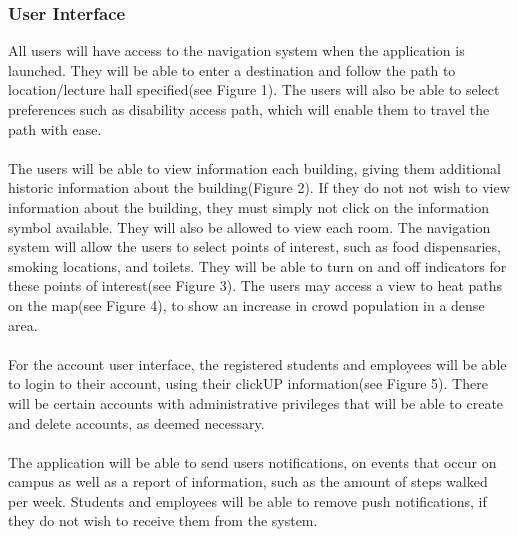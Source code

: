 \documentclass{article}
\begin{document}
            \subsubsection{User Interface}
	    {All users will have access to the navigation system when the application is launched.
They will be able to enter a destination and follow the path to location/lecture hall specified(see Figure 1).
The users will also be able to select preferences such as disability access path, which will enable them to travel the path with ease.\\\\
The users will be able to view information each building, giving them additional historic information about the building(Figure 2). If they do not not wish to 
view information about the building, they must simply not click on the information symbol available.
They will also be allowed to view each room. The navigation system will allow the users to select points of interest, such as food dispensaries, 
smoking locations, and toilets. They will be able to turn on and off indicators for these points of interest(see Figure 3).
The users may access a view to heat paths on the map(see Figure 4), to show an increase in crowd population in a dense area.\\\\
For the account user interface, the registered students and employees will be able to login to their account, using their clickUP information(see Figure 5).
There will be certain accounts with administrative privileges that will be able to create and delete accounts, as deemed necessary.\\\\
The application will be able to send users notifications, on events that occur on campus as well as a report of information, such as the amount of 
steps walked per week. Students and employees will be able to remove push notifications, if they do not wish to receive them from the system.\\\\
}
\end{document}
